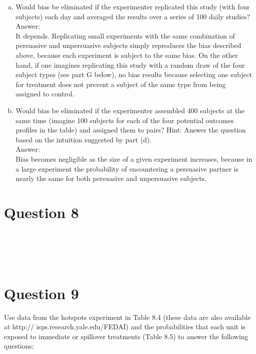 \documentclass[11pt,notitlepage]{article}\usepackage[]{graphicx}\usepackage[]{color}
\makeatletter
\newenvironment{kframe}{%
 \def\at@end@of@kframe{}%
 \ifinner\ifhmode%
  \def\at@end@of@kframe{\end{minipage}}%
  \begin{minipage}{\columnwidth}%
 \fi\fi%
 \def\FrameCommand##1{\hskip\@totalleftmargin \hskip-\fboxsep
 \colorbox{shadecolor}{##1}\hskip-\fboxsep
     \hskip-\linewidth \hskip-\@totalleftmargin \hskip\columnwidth}%
 \MakeFramed {\advance\hsize-\width
   \@totalleftmargin\z@ \linewidth\hsize
   \@setminipage}}%
 {\par\unskip\endMakeFramed%
 \at@end@of@kframe}
\newenvironment{knitrout}{}{} %
\makeatother
\begin{document}
\begin{enumerate}[a)]
\item Would bias be eliminated if the experimenter replicated this study (with four subjects) each day and averaged the results over a series of 100 daily studies? \\
Answer:\\
It depends. Replicating small experiments with the same combination of persuasive and unpersuasive subjects simply reproduces the bias described above, because each experiment is subject to the same bias.  On the other hand, if one imagines replicating this study with a random draw of the four subject types (see part G below), no bias results because selecting one subject for treatment does not prevent a subject of the same type from being assigned to control.
\item Would bias be eliminated if the experimenter assembled 400 subjects at the same time (imagine 100 subjects for each of the four potential outcomes profiles in the table) and assigned them to pairs? Hint: Answer the question based on the intuition suggested by part (d). \\
Answer:\\
Bias becomes negligible as the size of a given experiment increases, because in a large experiment the probability of encountering a persuasive partner is nearly the same for both persuasive and unpersuasive subjects.
\end{enumerate}

\section*{Question 8}
\begin{knitrout}
\color{fgcolor}\begin{kframe}
\begin{verbatim}





\end{verbatim}
\end{kframe}
\end{knitrout}


\section*{Question 9}
Use data from the hotspots experiment in Table 8.4 (these data are also available at http:// isps.research.yale.edu/FEDAI) and the probabilities that each unit is exposed to immediate or spillover treatments (Table 8.5) to answer the following questions:
\end{document}
